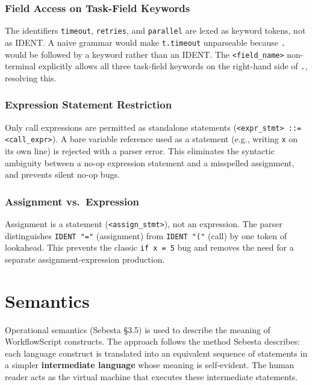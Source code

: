 \documentclass[10pt,a4paper]{article}
\begin{document}
\subsubsection{Field Access on Task-Field Keywords}

The identifiers \texttt{timeout}, \texttt{retries}, and \texttt{parallel}
are lexed as keyword tokens, not as IDENT. A naive grammar would make
\texttt{t.timeout} unparseable because \texttt{.} would be followed by
a keyword rather than an IDENT. The \texttt{<field\_name>} non-terminal
explicitly allows all three task-field keywords on the right-hand side
of \texttt{.}, resolving this.

\subsubsection{Expression Statement Restriction}

Only call expressions are permitted as standalone statements
(\texttt{<expr\_stmt> ::= <call\_expr>}). A bare variable reference
used as a statement (e.g., writing \texttt{x} on its own line) is
rejected with a parser error. This eliminates the syntactic ambiguity
between a no-op expression statement and a misspelled assignment, and
prevents silent no-op bugs.

\subsubsection{Assignment vs.\ Expression}

Assignment is a statement (\texttt{<assign\_stmt>}), not an expression.
The parser distinguishes \texttt{IDENT "="} (assignment) from
\texttt{IDENT "("} (call) by one token of lookahead. This prevents the
classic \texttt{if x = 5} bug and removes the need for a separate
assignment-expression production.

\section{Semantics}

Operational semantics (Sebesta \S3.5) is used to describe the meaning of WorkflowScript
constructs. The approach follows the method Sebesta describes: each language construct is
translated into an equivalent sequence of statements in a simpler \textbf{intermediate
language} whose meaning is self-evident. The human reader acts as the virtual machine that
executes these intermediate statements.
\end{document}
